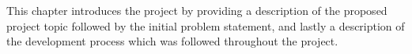 This chapter introduces the project by providing a description of the proposed
project topic followed by the initial problem statement, and lastly a description
of the development process which was followed throughout the project.

